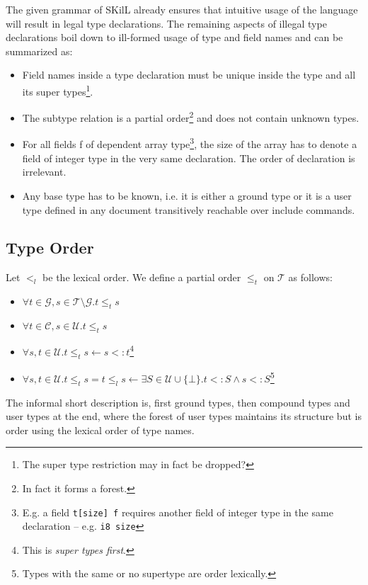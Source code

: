 \documentclass[a4paper,10pt]{article}
\newcommand{\skill}[0]{ SKilL }
\begin{document}
The given grammar of \skill already ensures that intuitive usage of the language will result in legal type declarations. The remaining aspects of illegal type declarations boil down to ill-formed usage of type and field names and can be summarized as:
\begin{itemize}
 \item Field names inside a type declaration must be unique inside the type and all its super types\footnote{The super type restriction may in fact be dropped?}.
 
 \item The subtype relation is a partial order\footnote{In fact it forms a forest.} and does not contain unknown types.

 \item For all fields f of dependent array type\footnote{E.g. a field \texttt{t[size] f} requires another field of integer type in the same declaration -- e.g. \texttt{i8 size}}, the size of the array has to denote a field of integer type in the very same declaration. The order of declaration is irrelevant.
 
 \item Any base type has to be known, i.e. it is either a ground type or it is a user type defined in any document transitively reachable over include commands.
\end{itemize}


\subsection*{Type Order}

Let $<_l$ be the lexical order. We define a partial order $\leq_t$ on $\mathcal{T}$ as follows:
\begin{itemize}
 \item $\forall t \in \mathcal{G}, s \in \mathcal{T}\setminus\mathcal{G}. t \leq_t s$
 \item $\forall t \in \mathcal{C}, s \in \mathcal{U}. t \leq_t s$
 \item $\forall s,t \in \mathcal{U}. t \leq_t s \leftarrow s <: t $\footnote{This is \textit{super types first}.}
 \item $\forall s,t \in \mathcal{U}. t \leq_t s = t \leq_l s\leftarrow \exists S \in \mathcal{U} \cup \{\bot\}. t <: S \wedge s <: S $\footnote{Types with the same or no supertype are order lexically.}
\end{itemize}

The informal short description is, first ground types, then compound types and user types at the end, where the forest of user types maintains its structure but is order using the lexical order of type names.
\end{document}
